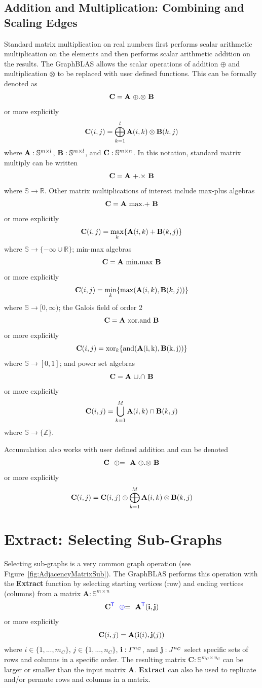 \subsection{Addition and Multiplication: Combining and Scaling Edges}
  Standard matrix multiplication on real numbers first performs scalar arithmetic multiplication on the elements and then performs scalar arithmetic addition on the results.  The GraphBLAS allows the scalar operations of addition $\oplus$ and multiplication $\otimes$ to be replaced with user defined functions.  This can be formally denoted as
$$
   {\bf C} = {\bf A} ~ {\oplus}.{\otimes} ~ {\bf B}
$$
or more explicitly
$$
   {\bf C}(i,j) = \bigoplus_{k=1}^l {\bf A}(i,k) \otimes {\bf B}(k,j)
$$
where ${\bf A}: \mathbb{S}^{m \times l}$,  ${\bf B}: \mathbb{S}^{m \times l}$, and ${\bf C}: \mathbb{S}^{m \times n}$.  In this notation, standard matrix multiply can be written
$$
   {\bf C} = {\bf A} ~ {+}.{\times} ~ {\bf B}
$$
where $\mathbb{S} \rightarrow \mathbb{R}$. Other matrix multiplications of interest include max-plus algebras
$$
   {\bf C} = {\bf A} ~ {\max}.{+} ~ {\bf B}
$$
or more explicitly
$$
   {\bf C}(i,j) = \max_k \{{\bf A}(i,k) + {\bf B}(k,j)\}
$$
where $\mathbb{S} \rightarrow \{-\infty \cup \mathbb{R}\}$; min-max algebras
$$
   {\bf C} = {\bf A} ~ {\min}.{\max} ~ {\bf B}
$$
or more explicitly
$$
   {\bf C}(i,j) = \min_k \{\max({\bf A}(i,k),{\bf B}(k,j))\}
$$
where $\mathbb{S} \rightarrow [0,\infty)$; the Galois field of order 2
$$
   {\bf C} = {\bf A} ~ {\rm xor}.{\rm and} ~ {\bf B}
$$
or more explicitly
$$
   {\bf C}(i,j) = {\rm xor}_k \{\rm and({\bf A}(i,k),{\bf B}(k,j))\}
$$
where $\mathbb{S} \rightarrow [0,1]$; and power set algebras
$$
   {\bf C} = {\bf A} ~ {\cup}.{\cap} ~ {\bf B}
$$
or more explicitly
$$
   {\bf C}(i,j) = \bigcup_{k=1}^M {\bf A}(i,k) \cap {\bf B}(k,j)
$$
where $\mathbb{S} \rightarrow \{\mathbb{Z}\}$.

  Accumulation also works with user defined addition and can be denoted
$$
   {\bf C} ~~ {\oplus}{=} ~~ {\bf A} ~ {\oplus}.{\otimes} ~ {\bf B}
$$
or more explicitly
$$
   {\bf C}(i,j) = {\bf C}(i,j) \oplus \bigoplus_{k=1}^M {\bf A}(i,k) \otimes {\bf B}(k,j)
$$


\section{Extract: Selecting Sub-Graphs}
  Selecting sub-graphs is a very common graph operation (see Figure~\ref{fig:AdjacencyMatrixSub}).  The GraphBLAS performs this operation with the {\bf Extract} function by selecting starting vertices (row) and ending vertices (columns) from a matrix $\mathbf{A} : \mathbb{S}^{m \times n}$
$$
   \mathbf{C}^{\textcolor{blue}{\sf T}} ~~ {\textcolor{blue}{\oplus}}{=} ~~  \mathbf{A}^{\textcolor{blue}{\sf T}}({\bf i},{\bf j})
$$
or more explicitly
$$
   {\bf C}(i,j) = {\bf A}({\bf i}(i),{\bf j}(j))
$$
where $i \in \{1,...,m_C\}$, $j \in \{1,...,n_C\}$, ${\bf i} : I^{m_C}$, and ${\bf j}: J^{n_C}$  select specific sets of rows and columns in a specific order.   The resulting matrix $\mathbf{C} : \mathbb{S}^{m_C \times n_C}$ can be larger or smaller than the input matrix $\mathbf{A}$.  {\bf Extract} can also be used to replicate and/or permute rows and columns in a matrix.

